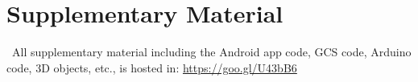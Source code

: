 \chapter*{Supplementary Material} \label{supplementary}
\
All supplementary material including the Android app code, GCS code, Arduino code, 3D objects, etc., is hosted in:
\url{https://goo.gl/U43bB6}
